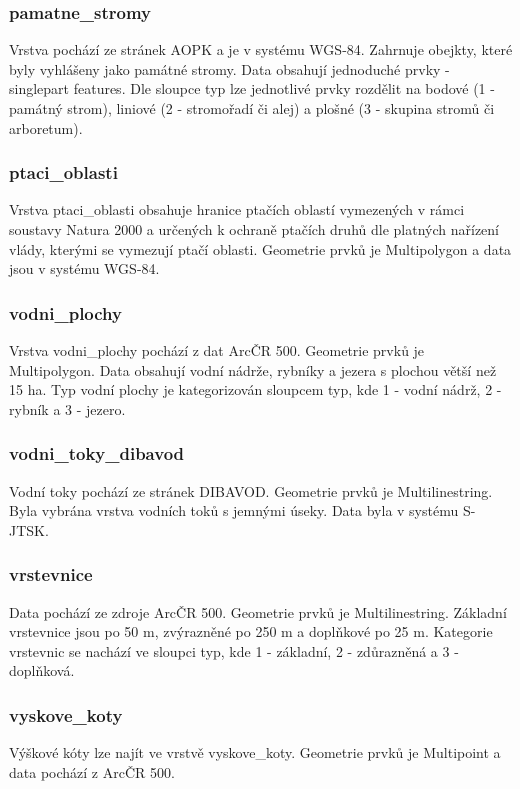 \documentclass[a4paper, 12pt]{article}
\begin{document}
\subsubsection{pamatne\_stromy}
Vrstva pochází ze stránek AOPK a je v systému WGS-84. Zahrnuje obejkty, které byly vyhlášeny jako památné stromy. Data obsahují jednoduché prvky - singlepart features. Dle sloupce typ lze jednotlivé prvky rozdělit na bodové (1 - památný strom), liniové (2 - stromořadí či alej) a plošné (3 - skupina stromů či arboretum).

\subsubsection{ptaci\_oblasti}
Vrstva ptaci\_oblasti obsahuje hranice ptačích oblastí vymezených v rámci soustavy Natura 2000 a určených k ochraně ptačích druhů dle platných nařízení vlády, kterými se vymezují ptačí oblasti. Geometrie prvků je Multipolygon a data jsou v systému WGS-84. 

\subsubsection{vodni\_plochy}
Vrstva vodni\_plochy pochází z dat ArcČR 500. Geometrie prvků je Multipolygon. Data obsahují vodní nádrže, rybníky a jezera s plochou větší než 15 ha. Typ vodní plochy je kategorizován sloupcem typ, kde 1 - vodní nádrž, 2 - rybník a 3 - jezero. 

\subsubsection{vodni\_toky\_dibavod}
Vodní toky pochází ze stránek DIBAVOD. Geometrie prvků je Multilinestring. Byla vybrána vrstva vodních toků s jemnými úseky. Data byla v systému S-JTSK. 

\subsubsection{vrstevnice}
Data pochází ze zdroje ArcČR 500. Geometrie prvků je Multilinestring. Základní vrstevnice jsou po 50 m, zvýrazněné po 250 m a doplňkové po 25 m. Kategorie vrstevnic se nachází ve sloupci typ, kde 1 - základní, 2 - zdůrazněná a 3 - doplňková.

\subsubsection{vyskove\_koty}
Výškové kóty lze najít ve vrstvě vyskove\_koty. Geometrie prvků je Multipoint a data pochází z ArcČR 500. 
\end{document}
